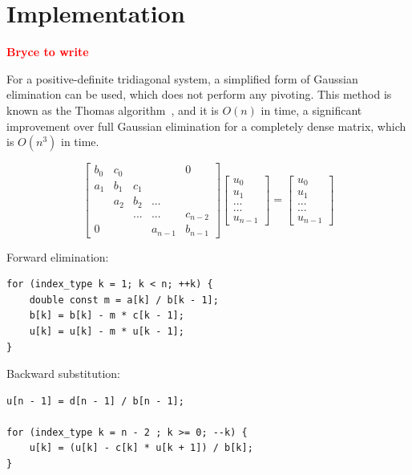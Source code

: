 \documentclass[conference]{IEEEtran}
\newcommand{\fix}[1]{{\bf \textcolor {red}{#1}}}
\begin{document}
\section{Implementation}
\fix{Bryce to write}

For a positive-definite tridiagonal system, 
a simplified form of Gaussian elimination can be used, 
which does not perform any pivoting. 
This method is known as the Thomas algorithm~\cite{},
and it is \(O(n)\) in time, a significant improvement over full Gaussian
elimination for a completely dense matrix, which is \(O(n^3)\) in time.

\[
\begin{bmatrix}
b_0 & c_0 &     &         & 0       \\
a_1 & b_1 & c_1 &         &         \\
    & a_2 & b_2 & ...     &         \\
    &     & ... & ...     & c_{n-2} \\
0   &     &     & a_{n-1} & b_{n-1}
\end{bmatrix}
\begin{bmatrix}
u_0     \\
u_1     \\
...     \\
...     \\
u_{n-1}
\end{bmatrix}
=
\begin{bmatrix}
u_0     \\
u_1     \\
...     \\
...     \\
u_{n-1}
\end{bmatrix}
\]

Forward elimination:

\begin{lstlisting}
for (index_type k = 1; k < n; ++k) {
    double const m = a[k] / b[k - 1];
    b[k] = b[k] - m * c[k - 1];
    u[k] = u[k] - m * u[k - 1];
} 
\end{lstlisting}

Backward substitution:

\begin{lstlisting}
u[n - 1] = d[n - 1] / b[n - 1];

for (index_type k = n - 2 ; k >= 0; --k) {
    u[k] = (u[k] - c[k] * u[k + 1]) / b[k];
} 
\end{lstlisting}
\end{document}
